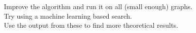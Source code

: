 \documentclass[preview]{standalone}
\begin{document}
Improve the algorithm and run it on all (small enough) graphs.\\Try using a machine learning based search.\\Use the output from these to find more theoretical results.\\
\end{document}
